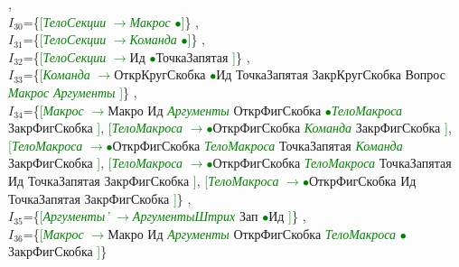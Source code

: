 \documentclass[a0]{a0poster}
\begin{document}
,\\
$I_{30}$=\{\textcolor{Green}{[}\textcolor{Green}{\textit{ТелоСекции}} \textcolor{Green}{$\to$}\textcolor{Green}{\textit{Макрос}} \textcolor{Green}{$\bullet$}\textcolor{Green}{]}\}
,\\
$I_{31}$=\{\textcolor{Green}{[}\textcolor{Green}{\textit{ТелоСекции}} \textcolor{Green}{$\to$}\textcolor{Green}{\textit{Команда}} \textcolor{Green}{$\bullet$}\textcolor{Green}{]}\}
,\\
$I_{32}$=\{\textcolor{Green}{[}\textcolor{Green}{\textit{ТелоСекции}} \textcolor{Green}{$\to$}Ид \textcolor{Green}{$\bullet$}ТочкаЗапятая \textcolor{Green}{]}\}
,\\
$I_{33}$=\{\textcolor{Green}{[}\textcolor{Green}{\textit{Команда}} \textcolor{Green}{$\to$}ОткрКругСкобка \textcolor{Green}{$\bullet$}Ид ТочкаЗапятая ЗакрКругСкобка Вопрос \textcolor{Green}{\textit{Макрос}} \textcolor{Green}{\textit{Аргументы}} \textcolor{Green}{]}\}
,\\
$I_{34}$=\{\textcolor{Green}{[}\textcolor{Green}{\textit{Макрос}} \textcolor{Green}{$\to$}Макро Ид \textcolor{Green}{\textit{Аргументы}} ОткрФигСкобка \textcolor{Green}{$\bullet$}\textcolor{Green}{\textit{ТелоМакроса}} ЗакрФигСкобка \textcolor{Green}{]}, \textcolor{Green}{[}\textcolor{Green}{\textit{ТелоМакроса}} \textcolor{Green}{$\to$}\textcolor{Green}{$\bullet$}ОткрФигСкобка \textcolor{Green}{\textit{Команда}} ЗакрФигСкобка \textcolor{Green}{]}, \textcolor{Green}{[}\textcolor{Green}{\textit{ТелоМакроса}} \textcolor{Green}{$\to$}\textcolor{Green}{$\bullet$}ОткрФигСкобка \textcolor{Green}{\textit{ТелоМакроса}} ТочкаЗапятая \textcolor{Green}{\textit{Команда}} ЗакрФигСкобка \textcolor{Green}{]}, \textcolor{Green}{[}\textcolor{Green}{\textit{ТелоМакроса}} \textcolor{Green}{$\to$}\textcolor{Green}{$\bullet$}ОткрФигСкобка \textcolor{Green}{\textit{ТелоМакроса}} ТочкаЗапятая Ид ТочкаЗапятая ЗакрФигСкобка \textcolor{Green}{]}, \textcolor{Green}{[}\textcolor{Green}{\textit{ТелоМакроса}} \textcolor{Green}{$\to$}\textcolor{Green}{$\bullet$}ОткрФигСкобка Ид ТочкаЗапятая ЗакрФигСкобка \textcolor{Green}{]}\}
,\\
$I_{35}$=\{\textcolor{Green}{[}\textcolor{Green}{\textit{Аргументы'}} \textcolor{Green}{$\to$}\textcolor{Green}{\textit{АргументыШтрих}} Зап \textcolor{Green}{$\bullet$}Ид \textcolor{Green}{]}\}
,\\
$I_{36}$=\{\textcolor{Green}{[}\textcolor{Green}{\textit{Макрос}} \textcolor{Green}{$\to$}Макро Ид \textcolor{Green}{\textit{Аргументы}} ОткрФигСкобка \textcolor{Green}{\textit{ТелоМакроса}} \textcolor{Green}{$\bullet$}ЗакрФигСкобка \textcolor{Green}{]}\}
\end{document}
